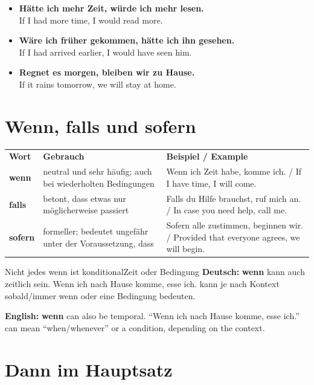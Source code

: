 \documentclass[a4paper,11pt]{article}
\newcommand{\GermanText}[1]{\textbf{Deutsch: }#1\par}
\newcommand{\EnglishText}[1]{{\small\color{SoftGray}\textbf{English: }#1\par}}
\newcommand{\ExampleItem}[2]{\item \textbf{#1}\\{\small\color{SoftGray}#2}}
\begin{document}
        \begin{exbox}
            \begin{itemize}
                \ExampleItem{Hätte ich mehr Zeit, würde ich mehr lesen.}{If I had more time, I would read more.}
                \ExampleItem{Wäre ich früher gekommen, hätte ich ihn gesehen.}{If I had arrived earlier, I would have seen him.}
                \ExampleItem{Regnet es morgen, bleiben wir zu Hause.}{If it rains tomorrow, we will stay at home.}
            \end{itemize}
        \end{exbox}

    \section{Wenn, falls und sofern}

        \begin{longtable}{>{\bfseries}p{2.5cm}|p{5cm}|p{5.2cm}}
            \rowcolor{HeaderBlueDark}
            \color{white}\textbf{Wort} &
            \color{white}\textbf{Gebrauch} &
            \color{white}\textbf{Beispiel / Example} \\
            wenn & neutral und sehr häufig; auch bei wiederholten Bedingungen & Wenn ich Zeit habe, komme ich. / If I have time, I will come. \\
            falls & betont, dass etwas nur möglicherweise passiert & Falls du Hilfe brauchst, ruf mich an. / In case you need help, call me. \\
            sofern & formeller; bedeutet ungefähr unter der Voraussetzung, dass & Sofern alle zustimmen, beginnen wir. / Provided that everyone agrees, we will begin. \\
        \end{longtable}

        \begin{grammarentry}{Nicht jedes wenn ist konditional}{Zeit oder Bedingung}
            \GermanText{\textbf{wenn} kann auch zeitlich sein. \glqq Wenn ich nach Hause komme, esse ich.\grqq{} kann je nach Kontext \glqq sobald/immer wenn\grqq{} oder eine Bedingung bedeuten.}
            \EnglishText{\textbf{wenn} can also be temporal. ``Wenn ich nach Hause komme, esse ich.'' can mean ``when/whenever'' or a condition, depending on the context.}
        \end{grammarentry}

    \section{Dann im Hauptsatz}
\end{document}
